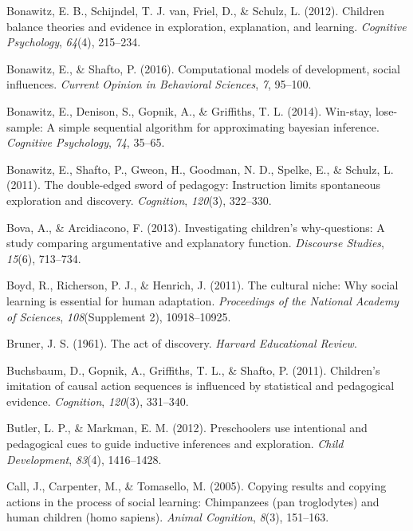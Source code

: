 \documentclass[english,floatsintext,man]{apa6}
\theoremstyle{definition}
\theoremstyle{definition}
\theoremstyle{definition}
\theoremstyle{remark}
\begin{document}
\hypertarget{ref-bonawitz2012children}{}
Bonawitz, E. B., Schijndel, T. J. van, Friel, D., \& Schulz, L. (2012).
Children balance theories and evidence in exploration, explanation, and
learning. \emph{Cognitive Psychology}, \emph{64}(4), 215--234.

\hypertarget{ref-bonawitz2016computational}{}
Bonawitz, E., \& Shafto, P. (2016). Computational models of development,
social influences. \emph{Current Opinion in Behavioral Sciences},
\emph{7}, 95--100.

\hypertarget{ref-bonawitz2014win}{}
Bonawitz, E., Denison, S., Gopnik, A., \& Griffiths, T. L. (2014).
Win-stay, lose-sample: A simple sequential algorithm for approximating
bayesian inference. \emph{Cognitive Psychology}, \emph{74}, 35--65.

\hypertarget{ref-bonawitz2011double}{}
Bonawitz, E., Shafto, P., Gweon, H., Goodman, N. D., Spelke, E., \&
Schulz, L. (2011). The double-edged sword of pedagogy: Instruction
limits spontaneous exploration and discovery. \emph{Cognition},
\emph{120}(3), 322--330.

\hypertarget{ref-bova2013investigating}{}
Bova, A., \& Arcidiacono, F. (2013). Investigating children's
why-questions: A study comparing argumentative and explanatory function.
\emph{Discourse Studies}, \emph{15}(6), 713--734.

\hypertarget{ref-boyd2011cultural}{}
Boyd, R., Richerson, P. J., \& Henrich, J. (2011). The cultural niche:
Why social learning is essential for human adaptation. \emph{Proceedings
of the National Academy of Sciences}, \emph{108}(Supplement 2),
10918--10925.

\hypertarget{ref-bruner1961act}{}
Bruner, J. S. (1961). The act of discovery. \emph{Harvard Educational
Review}.

\hypertarget{ref-buchsbaum2011children}{}
Buchsbaum, D., Gopnik, A., Griffiths, T. L., \& Shafto, P. (2011).
Children's imitation of causal action sequences is influenced by
statistical and pedagogical evidence. \emph{Cognition}, \emph{120}(3),
331--340.

\hypertarget{ref-butler2012preschoolers}{}
Butler, L. P., \& Markman, E. M. (2012). Preschoolers use intentional
and pedagogical cues to guide inductive inferences and exploration.
\emph{Child Development}, \emph{83}(4), 1416--1428.

\hypertarget{ref-call2005copying}{}
Call, J., Carpenter, M., \& Tomasello, M. (2005). Copying results and
copying actions in the process of social learning: Chimpanzees (pan
troglodytes) and human children (homo sapiens). \emph{Animal Cognition},
\emph{8}(3), 151--163.
\end{document}
